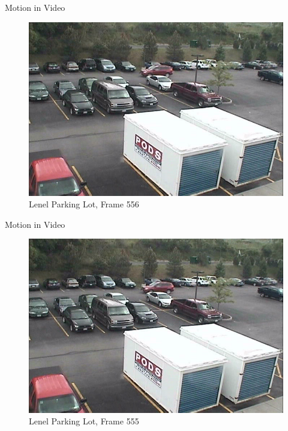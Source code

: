 \documentclass{beamer}
\begin{document}
\begin{frame}[c]{\sc Motion in Video}

\begin{figure}[!h]
\centering
\includegraphics[width=.9\columnwidth]{Lenel010L(556)}
\caption{Lenel Parking Lot, Frame 556}
\label{Lenel556}
\end{figure}

\end{frame}

\begin{frame}[c]{\sc Motion in Video}

\begin{figure}[!h]
\centering
\includegraphics[width=.9\columnwidth]{Lenel010L(555)}
\caption{Lenel Parking Lot, Frame 555}
\label{Lenel555s}
\end{figure}

\end{frame}
\end{document}
